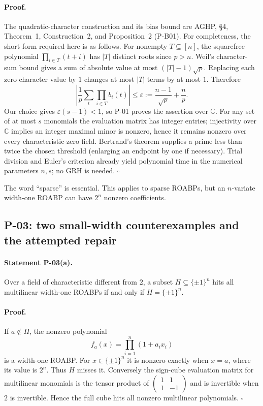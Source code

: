 \documentclass[11pt,a4paper]{article}
\theoremstyle{definition}\newtheorem{definition}{Definition}
\begin{document}
\paragraph{Proof.}
The quadratic-character construction and its bias bound are AGHP, \S4, Theorem~1, Construction~2, and Proposition~2 (P-B01). For completeness, the short form required here is as follows. For nonempty $T\subseteq[n]$, the squarefree polynomial $\prod_{i\in T}(t+i)$ has $|T|$ distinct roots since $p>n$. Weil's character-sum bound gives a sum of absolute value at most $(|T|-1)\sqrt p$. Replacing each zero character value by $1$ changes at most $|T|$ terms by at most $1$. Therefore
\[
 \left|\frac1p\sum_t\prod_{i\in T}b_i(t)\right|
 \le \varepsilon:=\frac{n-1}{\sqrt p}+\frac np.
\]
Our choice gives $\varepsilon(s-1)<1$, so P-01 proves the assertion over $\mathbb C$. For any set of at most $s$ monomials the evaluation matrix has integer entries; injectivity over $\mathbb C$ implies an integer maximal minor is nonzero, hence it remains nonzero over every characteristic-zero field. Bertrand's theorem supplies a prime less than twice the chosen threshold (enlarging an endpoint by one if necessary). Trial division and Euler's criterion already yield polynomial time in the numerical parameters $n,s$; no GRH is needed. $\square$

The word ``sparse'' is essential. This applies to sparse ROABPs, but an $n$-variate width-one ROABP can have $2^n$ nonzero coefficients.

\subsection{P-03: two small-width counterexamples and the attempted repair}
\paragraph{Statement P-03(a).}
Over a field of characteristic different from $2$, a subset $H\subseteq\{\pm1\}^n$ hits all multilinear width-one ROABPs if and only if $H=\{\pm1\}^n$.
\paragraph{Proof.}
If $a\notin H$, the nonzero polynomial
\[
 f_a(x)=\prod_{i=1}^n(1+a_ix_i)
\]
is a width-one ROABP. For $x\in\{\pm1\}^n$ it is nonzero exactly when $x=a$, where its value is $2^n$. Thus $H$ misses it. Conversely the sign-cube evaluation matrix for multilinear monomials is the tensor product of $\begin{pmatrix}1&1\\1&-1\end{pmatrix}$ and is invertible when $2$ is invertible. Hence the full cube hits all nonzero multilinear polynomials. $\square$
\end{document}
